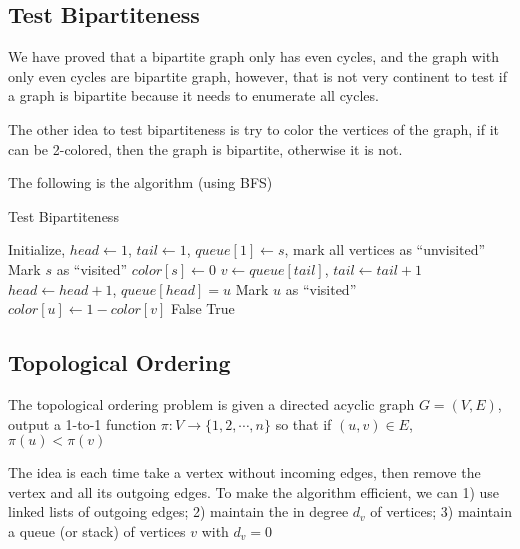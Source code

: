 			\subsection{Test Bipartiteness}
				We have proved that a bipartite graph only has even cycles, and the graph with only even cycles are bipartite graph, however, that is not very continent to test if a graph is bipartite because it needs to enumerate all cycles.

				The other idea to test bipartiteness is try to color the vertices of the graph, if it can be 2-colored, then the graph is bipartite, otherwise it is not.

				The following is the algorithm (using BFS)
				\begin{algorithm}[h]
					\caption{Test Bipartiteness}
					\begin{algorithmic}[1]
						\State Initialize, $head \gets 1$, $tail \gets 1$, $queue[1] \gets s$, mark all vertices as ``unvisited''
						\State Mark $s$ as ``visited''
						\State $color[s] \gets 0$
							\State $v \gets queue[tail]$, $tail \gets tail + 1$
									\State $head \gets head + 1$, $queue[head] = u$
									\State Mark $u$ as ``visited''
									\State $color[u] \gets 1 - color[v]$
								\Else
										\Return False
									\EndIf
								\EndIf
							\EndFor
						\EndWhile
						\Return True
					\end{algorithmic}
				\end{algorithm}

			\subsection{Topological Ordering}
				The topological ordering problem is given a directed acyclic graph $G = (V, E)$, output a 1-to-1 function $\pi: V\rightarrow\{1, 2, \cdots, n\}$ so that if $(u, v) \in E$, $\pi(u) < \pi(v)$

				The idea is each time take a vertex without incoming edges, then remove the vertex and all its outgoing edges. To make the algorithm efficient, we can 1) use linked lists of outgoing edges; 2) maintain the in degree $d_v$ of vertices; 3) maintain a queue (or stack) of vertices $v$ with $d_v = 0$

